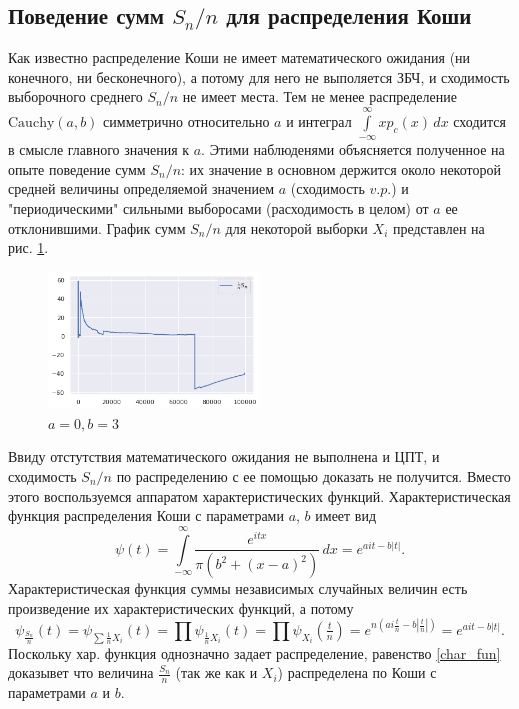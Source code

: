 \subsection{Поведение сумм $S_n/n$ для распределения Коши}
	Как известно распределение Коши не имеет математического ожидания (ни 
	конечного, ни бесконечного), а потому для него не выполяется ЗБЧ, и 
	сходимость выборочного среднего $S_n/n$ не имеет места. Тем не менее 
	распределение $\mathrm{Cauchy}(a,b)$ симметрично относительно $a$ и интеграл 
	$\int\limits_{-\infty}^{\infty} x p_{c}(x)\, dx$ сходится  в смысле главного 
	значения к $a$. Этими наблюденями объясняется полученное на опыте поведение
	сумм $S_n/n$: их значение в основном держится около некоторой средней 
	величины определяемой значением $a$ (сходимость $v.p.$) и "периодическими" 
	сильными выборосами (расходимость в целом) от $a$ ее отклонившими. График 
	сумм $S_n/n$ для некоторой выборки $X_i$ представлен на 
	рис. \ref{cauchy_sums}.

	\begin{figure}[tbp]
        \centering
        \includegraphics[width=0.5\textwidth]{resources/task5_cauchy.png}
        \caption{$a=0, b=3$}
        \label{cauchy_sums}
    \end{figure}

	Ввиду отстутствия математического ожидания не выполнена и ЦПТ, и сходимость 
	$S_n/n$ по распределению с ее помощью доказать не получится. Вместо этого 
	воспользуемся аппаратом характеристических функций. Характеристическая 
	функция распределения Коши с параметрами $a$, $b$ имеет вид
	\begin{equation*}
		\psi(t) = 
		\int\limits_{-\infty}^{\infty} \frac{e^{itx}}{\pi(b^2 + (x-a)^2)} \,dx =
		e^{ait-b|t|}.
	\end{equation*}
	Характеристическая функция суммы независимых случайных величин есть 
	произведение их характеристических функций, а потому
	\begin{equation} \label{char_fun}
		\psi_{\frac{S_n}{n}}(t) = \psi_{\sum \frac{1}{n} X_i} (t) = 
		\prod \psi_{\frac{1}{n} X_i} (t) = \prod \psi_{X_i} (\tfrac{t}{n}) = 
		e^{n(ai\frac{t}{n}-b|\frac{t}{n}|)} = e^{ait-b|t|}.
	\end{equation}
	Поскольку хар. функция однозначно задает распределение, равенство 
	\eqref{char_fun} доказывет что величина $\frac{S_n}{n}$ (так же как и 
	${X_i}$) распределена по Коши с параметрами $a$ и $b$.